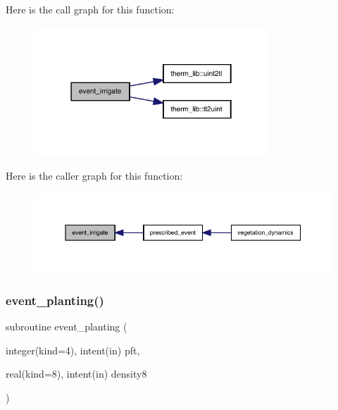Here is the call graph for this function\+:
\nopagebreak
\begin{figure}[H]
\begin{center}
\leavevmode
\includegraphics[width=250pt]{events_8f90_a197a13ef9490ada81059c66e30c88b66_cgraph}
\end{center}
\end{figure}
Here is the caller graph for this function\+:
\nopagebreak
\begin{figure}[H]
\begin{center}
\leavevmode
\includegraphics[width=350pt]{events_8f90_a197a13ef9490ada81059c66e30c88b66_icgraph}
\end{center}
\end{figure}
\mbox{\label{events_8f90_a3fcb64b4de4ae9408c3e365f6cbd1be6}} 
\subsubsection{\texorpdfstring{event\+\_\+planting()}{event\_planting()}}
{\footnotesize\ttfamily subroutine event\+\_\+planting (\begin{DoxyParamCaption}\item[{integer(kind=4), intent(in)}]{pft,  }\item[{real(kind=8), intent(in)}]{density8 }\end{DoxyParamCaption})}

